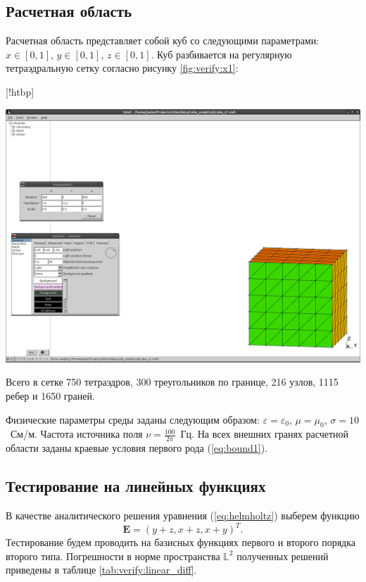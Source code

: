 \documentclass[a4paper,14pt]{article}
\makeatletter
\renewenvironment{figure}[1][\fps@figure]{
  \edef\@tempa{\noexpand\@float{figure}[#1]}
  \@tempa
  \addtocounter{foofigure}{1}
}{
  \end@float
}
\makeatother
\begin{document}
\subsection{Расчетная область}
Расчетная область представляет собой куб со следующими параметрами: $x \in [0,1]$, $y \in [0,1]$, $z \in [0,1]$. Куб разбивается на регулярную тетраэдральную сетку согласно рисунку \ref{fig:verify:x1}:

\begin{figure}[!htbp]
	\centering
	\includegraphics[trim=387mm 20mm 5mm 220mm,clip,scale=0.4]{verify/x1.png}
	\caption{конечноэлементная сетка для верификации}
	\label{fig:verify:x1}
\end{figure}

\noindent Всего в сетке 750 тетраэдров, 300 треугольников по границе, 216 узлов, 1115 ребер и 1650 граней.

Физические параметры среды заданы следующим образом: $\varepsilon = \varepsilon_0$, $\mu = \mu_0$, $\sigma = 10$~См/м. Частота источника поля $\nu = \frac{100}{2 \pi}$~Гц. На всех внешних гранях расчетной области заданы краевые условия первого рода (\ref{eq:bound1}).


\subsection{Тестирование на линейных функциях}
В качестве аналитического решения уравнения (\ref{eq:helmholtz}) выберем функцию
\begin{equation*}
	\mathbf{E} = ( y+z , x+z, x+y )^T .
\end{equation*}
Тестирование будем проводить на базисных функциях первого и второго порядка второго типа. Погрешности в норме пространства $\mathbb{L}^2$ полученных решений приведены в таблице \ref{tab:verify:linear_diff}.
\end{document}
